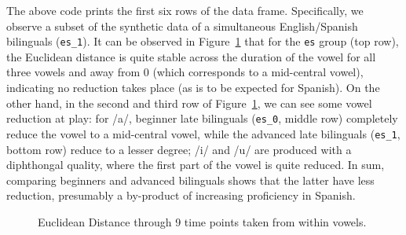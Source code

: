 \documentclass[
  letterpaper,
  DIV=11,
  numbers=noendperiod]{scrartcl}
\begin{document}
The above code prints the first six rows of the data frame.
Specifically, we observe a subset of the synthetic data of a
simultaneous English/Spanish bilinguals (\texttt{es\_1}). It can be
observed in Figure~\ref{fig-dat2} that for the \texttt{es} group (top
row), the Euclidean distance is quite stable across the duration of the
vowel for all three vowels and away from 0 (which corresponds to a
mid-central vowel), indicating no reduction takes place (as is to be
expected for Spanish). On the other hand, in the second and third row of
Figure~\ref{fig-dat2}, we can see some vowel reduction at play: for /a/,
beginner late bilinguals (\texttt{es\_0}, middle row) completely reduce
the vowel to a mid-central vowel, while the advanced late bilinguals
(\texttt{es\_1}, bottom row) reduce to a lesser degree; /i/ and /u/ are
produced with a diphthongal quality, where the first part of the vowel
is quite reduced. In sum, comparing beginners and advanced bilinguals
shows that the latter have less reduction, presumably a by-product of
increasing proficiency in Spanish.

\begin{figure}


\caption{\label{fig-dat2}Euclidean Distance through 9 time points taken
from within vowels.}

\end{figure}%
\end{document}
